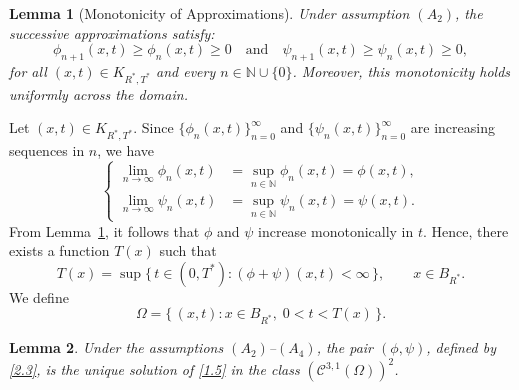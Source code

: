 \documentclass[10pt,a4paper]{amsart}
\newtheorem{lemma}{Lemma}
\begin{document}
\begin{lemma}[Monotonicity of Approximations]\label{lem:2.1}
Under assumption $(A_2)$, the successive approximations satisfy:
$$
\phi_{n+1}(x,t) \geq \phi_n(x,t) \geq 0 \quad \text{and} \quad \psi_{n+1}(x,t) \geq \psi_n(x,t) \geq 0,
$$
for all $(x,t) \in K_{R^*,T^*}$ and every $n \in \mathbb{N} \cup \{0\}$. Moreover, this monotonicity holds uniformly across the domain.
\end{lemma}

Let $(x,t) \in K_{R^*, T^*}$. Since $\{\phi_n(x,t)\}_{n=0}^\infty$ and $\{\psi_n(x,t)\}_{n=0}^\infty$ are increasing sequences in $n$, we have
\begin{equation}
\left\{
  \begin{aligned}
    \lim_{n \to \infty} \phi_n(x,t) &= \sup_{n \in \mathbb{N}} \phi_n(x,t) = \phi(x,t), \\
    \lim_{n \to \infty} \psi_n(x,t) &= \sup_{n \in \mathbb{N}} \psi_n(x,t) = \psi(x,t).
  \end{aligned}
    \label{2.3}
    \right.
\end{equation}
From Lemma~\ref{lem:2.1}, it follows that $\phi$ and $\psi$ increase monotonically in $t$. Hence, there exists a function $T(x)$ such that
$$
  T(x) = \sup \{\, t \in (0, T^*) : (\phi + \psi)(x,t) < \infty \,\}, \qquad x \in B_{R^*}.
$$
We define
\begin{equation}
    \label{omega}
  \Omega = \{\, (x,t) : x \in B_{R^*}, \; 0 < t < T(x) \,\}.
\end{equation}

\begin{lemma}\label{lemma 2.3}
  Under the assumptions $(A_2)$--$(A_4)$, the pair $(\phi, \psi)$,  defined by \eqref{2.3}, is the unique solution of \eqref{1.5} in the class $(\mathcal{C}^{3,1}(\Omega))^2$.
\end{lemma}
\end{document}
